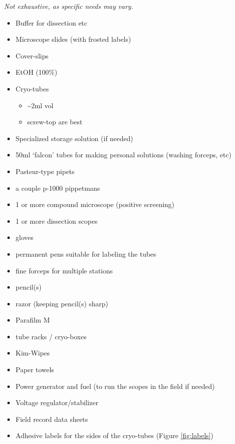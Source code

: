 \documentclass[letterpaper]{scrreprt}
\begin{document}
\emph{Not exhaustive, as specific needs may vary.}

\begin{itemize}
\itemsep1pt\parskip0pt
\item
  Buffer for dissection etc
\item
  Microscope slides (with frosted labels)
\item
  Cover-slips
\item
  EtOH (100\%)
\item
  Cryo-tubes

  \begin{itemize}
  \itemsep1pt\parskip0pt
  \item
    \textasciitilde{}2ml vol
  \item
    screw-top are best
  \end{itemize}
\item
  Specialized storage solution (if needed)
\item
  50ml `falcon' tubes for making personal solutions (washing forceps,
  etc)
\item
  Pasteur-type pipets
\item
  a couple p-1000 pippetmans
\item
  1 or more compound microscope (positive screening)
\item
  1 or more dissection scopes
\item
  gloves
\item
  permanent pens suitable for labeling the tubes
\item
  fine forceps for multiple stations
\item
  pencil(s)
\item
  razor (keeping pencil(s) sharp)
\item
  Parafilm M
\item
  tube racks / cryo-boxes
\item
  Kim-Wipes
\item
  Paper towels
\item
  Power generator and fuel (to run the scopes in the field if needed)
\item
  Voltage regulator/stabilizer
\item
  Field record data sheets
\item
  Adhesive labels for the sides of the cryo-tubes (Figure
  \ref{fig:labels})
\end{itemize}
\end{document}
